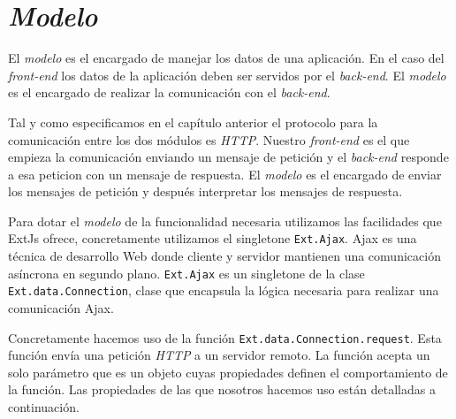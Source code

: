 \section{\emph{Modelo}}
	El \emph{modelo} es el encargado de manejar los datos de una aplicación. En el caso del \emph{front-end} los datos de la aplicación deben ser
	servidos por el \emph{back-end}. El \emph{modelo} es el encargado de realizar la comunicación con el \emph{back-end}. 
	\par
	Tal y como especificamos en el  capítulo anterior el protocolo para la comunicación entre los dos módulos es \emph{HTTP}. Nuestro
	\emph{front-end} es el que empieza la comunicación enviando un mensaje de petición y el \emph{back-end} responde a esa peticion con un mensaje
	de respuesta. El \emph{modelo} es el encargado de enviar los mensajes de petición y después interpretar los mensajes de respuesta.
	\par
	Para dotar el \emph{modelo} de la funcionalidad necesaria utilizamos las facilidades que ExtJs ofrece, concretamente utilizamos el singletone
	\texttt{Ext.Ajax}. Ajax\cite{AjaxWiki} es una técnica de desarrollo Web donde cliente y servidor mantienen una comunicación asíncrona en
	segundo plano. \texttt{Ext.Ajax} es un singletone de la clase \texttt{Ext.data.Connection}, clase que encapsula la lógica necesaria para
	realizar una comunicación Ajax. 
	\par
	Concretamente hacemos uso de la función \texttt{Ext.data.Connection.request}. Esta función envía una petición \emph{HTTP} a un servidor
	remoto. La función acepta un solo parámetro que es un objeto cuyas propiedades definen el comportamiento de la función. Las propiedades de las
	que nosotros hacemos uso están detalladas a continuación. 

